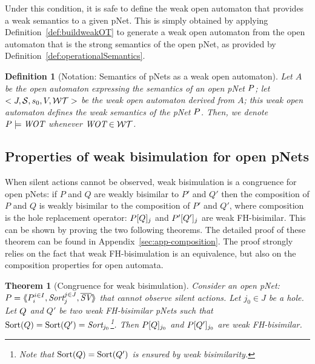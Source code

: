 \documentclass{lmcs}
\newcommand{\TODO}[1]{\textcolor{red}{\textbf{[TODO:#1]}}}
\newtheorem{theorem}{Theorem}
\newtheorem{definition}{Definition}
\begin{document}

Under this condition, it is safe to define the weak open automaton that provides a weak semantics to a given pNet. This is simply obtained by applying Definition~\ref{def:buildweakOT} to generate a weak open automaton from the open automaton that is the strong semantics of the open pNet, as provided by Definition~\ref{def:operationalSemantics}.

\begin{definition}[Notation: Semantics of pNets as a weak open automaton]
Let $A$ be the open automaton expressing the semantics of an open pNet $P$; let $<J,\mathcal{S},s_0, V, \mathcal{WT}>$ be the weak open automaton derived from $A$; this weak open automaton defines the weak semantics of the pNet $P$. Then, we denote $\pNet \models \WOT$ whenever $\WOT\in\WT$.
\end{definition}


\subsection{Properties of weak bisimulation for open pNets}

When silent actions cannot be observed, weak bisimulation is a congruence for open pNets: if $P$ and $Q$ are weakly bisimilar to $P'$ and $Q'$ then the composition of $P$ and $Q$ is weakly bisimilar to the composition of $P'$ and $Q'$, where composition is the hole replacement operator: 	$P[Q]_{j}$ and 
	$P'[Q']_{j}$ are weak FH-bisimilar. This can be shown by proving the two following theorems.
The detailed proof of these theorem can be found in Appendix~\ref{sec:app-composition}. The proof strongly relies on the fact that weak FH-bisimulation is an equivalence, but also on the composition properties for open automata.

\begin{theorem}[Congruence for  weak bisimulation]\label{weak-thm-congr-eq}
	Consider an open pNet:
	$\pNet = \mylangle \pNet_i^{i\in I}, \Sort_j^{j\in J}, 
	\set{\symb{SV}}\myrangle$ that cannot observe silent actions.
	Let $j_0\in J$ be a hole. Let $Q$ and $Q'$ be two weak FH-bisimilar pNets such that 
	$\Sortop(\pNetQ)=\Sortop(\pNetQ')=\Sort_{j_0}$\footnote{Note that $\operatorname{Sort}(Q)=\operatorname{Sort}(Q')$ is 
	ensured by 
	weak bisimilarity.}. Then 
	$P[Q]_{j_0}$ and 
	$P[Q']_{j_0}$ are weak FH-bisimilar.
\end{theorem}
\end{document}
